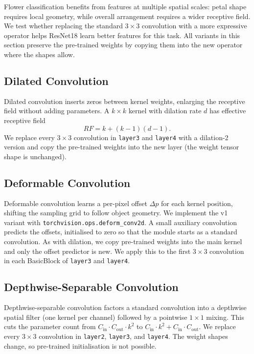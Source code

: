 Flower classification benefits from features at multiple spatial scales: petal shape requires local geometry, while overall arrangement requires a wider receptive field. We test whether replacing the standard $3 \times 3$ convolution with a more expressive operator helps ResNet18 learn better features for this task. All variants in this section preserve the pre-trained weights by copying them into the new operator where the shapes allow.

\subsection{Dilated Convolution}
Dilated convolution \citep{yu2016dilated} inserts zeros between kernel weights, enlarging the receptive field without adding parameters. A $k \times k$ kernel with dilation rate $d$ has effective receptive field
\[
  RF = k + (k-1)(d-1).
\]
We replace every $3 \times 3$ convolution in \texttt{layer3} and \texttt{layer4} with a dilation-2 version and copy the pre-trained weights into the new layer (the weight tensor shape is unchanged).

\subsection{Deformable Convolution}
Deformable convolution \citep{dai2017deformable} learns a per-pixel offset $\Delta p$ for each kernel position, shifting the sampling grid to follow object geometry. We implement the v1 variant with \texttt{torchvision.ops.deform\_conv2d}. A small auxiliary convolution predicts the offsets, initialised to zero so that the module starts as a standard convolution. As with dilation, we copy pre-trained weights into the main kernel and only the offset predictor is new. We apply this to the first $3 \times 3$ convolution in each BasicBlock of \texttt{layer3} and \texttt{layer4}.

\subsection{Depthwise-Separable Convolution}
Depthwise-separable convolution \citep{howard2017mobilenets} factors a standard convolution into a depthwise spatial filter (one kernel per channel) followed by a pointwise $1 \times 1$ mixing. This cuts the parameter count from $C_{\text{in}} \cdot C_{\text{out}} \cdot k^2$ to $C_{\text{in}} \cdot k^2 + C_{\text{in}} \cdot C_{\text{out}}$. We replace every $3 \times 3$ convolution in \texttt{layer2}, \texttt{layer3}, and \texttt{layer4}. The weight shapes change, so pre-trained initialisation is not possible.

